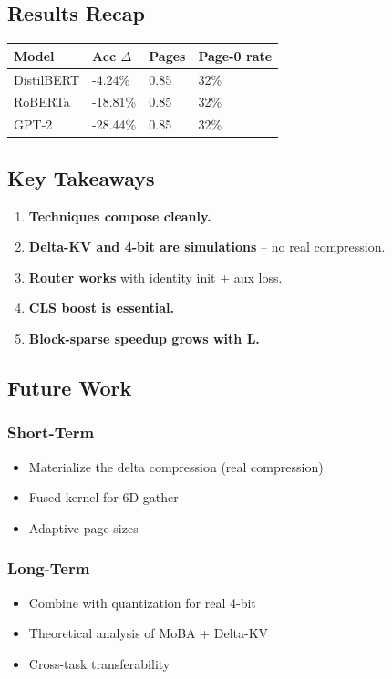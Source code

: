 \subsection{Results Recap}

\begin{table}[H]
\centering
\small
\begin{tabular}{llll}
\toprule
\textbf{Model} & \textbf{Acc $\Delta$} & \textbf{Pages} & \textbf{Page-0 rate} \\
\midrule
DistilBERT & -4.24\% & 0.85 & 32\% \\
RoBERTa & -18.81\% & 0.85 & 32\% \\
GPT-2 & -28.44\% & 0.85 & 32\% \\
\bottomrule
\end{tabular}
\end{table}

\subsection{Key Takeaways}

\begin{enumerate}
\item \textbf{Techniques compose cleanly.}
\item \textbf{Delta-KV and 4-bit are simulations} -- no real compression.
\item \textbf{Router works} with identity init + aux loss.
\item \textbf{CLS boost is essential.}
\item \textbf{Block-sparse speedup grows with L.}

\end{enumerate}
\subsection{Future Work}

\subsubsection{Short-Term}
\begin{itemize}
\item Materialize the delta compression (real compression)
\item Fused kernel for 6D gather
\item Adaptive page sizes

\end{itemize}
\subsubsection{Long-Term}
\begin{itemize}
\item Combine with quantization for real 4-bit
\item Theoretical analysis of MoBA + Delta-KV
\item Cross-task transferability

\end{itemize}
